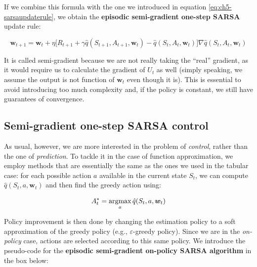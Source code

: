 If we combine this formula with the one we introduced in equation \ref{eq:ch5-sarsaupdaterule}, we obtain the \textbf{episodic semi-gradient one-step SARSA} update rule:

\begin{equation}
    \boldsymbol{w}_{t+1} = \boldsymbol{w}_t + \eta \big[ R_{t+1} + \gamma \hat{q}(S_{t+1},A_{t+1},\boldsymbol{w}_t) - \hat{q}(S_t,A_t,\boldsymbol{w}_t) \big] \nabla \hat{q}(S_t,A_t,\boldsymbol{w}_t)
    \label{eq:ch7-sarsaqvaluefunctionapproxssdweightupdate}
\end{equation}

It is called semi-gradient because we are not really taking the ``real'' gradient, as it would require us to calculate the gradient of $U_t$ as well (simply speaking, we assume the output is not function of $\boldsymbol{w}_t$ even though it is). This is essential to avoid introducing too much complexity and, if the policy is constant, we still have guarantees of convergence.

\subsection{Semi-gradient one-step SARSA control}
As usual, however, we are more interested in the problem of \textit{control}, rather than the one of \textit{prediction}. To tackle it in the case of function approximation, we employ methods that are essentially the same as the ones we used in the tabular case: for each possible action $a$ available in the current state $S_t$, we can compute $\hat{q}(S_t,a,\boldsymbol{w}_t)$ and then find the greedy action using:

\begin{equation*}
    A_{t}^{*} = \operatorname*{argmax}_a \hat{q}(S_t,a,\boldsymbol{w}_t)
\end{equation*}

Policy improvement is then done by changing the estimation policy to a soft approximation of the greedy policy (e.g., $\varepsilon$-greedy policy). Since we are in the \textit{on-policy} case, actions are selected according to this same policy. We introduce the pseudo-code for the \textbf{episodic semi-gradient on-policy SARSA algorithm} in the box below:

